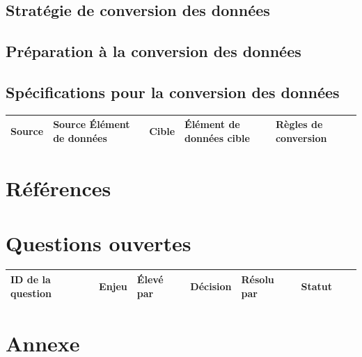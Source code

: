 \documentclass[a4paper,12pt]{report}  %
\begin{document}
	\subsection{Stratégie de conversion des données}
	\lipsum[24]
	
	\subsection{Préparation à la conversion des données}
	\lipsum[25]
	
	\subsection{Spécifications pour la conversion des données}
	\lipsum[26]
	\begin{longtable}{|l|l|l|l|l|}
		\hline
		\textbf{Source} & \textbf{Source Élément de données} & \textbf{Cible} & \textbf{Élément de données cible} & \textbf{Règles de conversion} \\
		\hline
	\end{longtable}
	
	\section{Références}
	\lipsum[27]
	
	\section{Questions ouvertes}
	\lipsum[28]
	
	\begin{longtable}{|l|l|l|l|l|l|l|l|}
		\hline
		\textbf{ID de la question} & \textbf{Enjeu} & \textbf{Élevé par} & \textbf{Décision} & \textbf{Résolu par} & \textbf{Statut} \\
		\hline
	\end{longtable}
	
	\section{Annexe}
	\lipsum[29]
	
\end{document}
